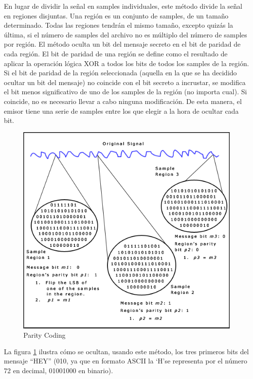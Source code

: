 \documentclass[12pt]{article}
\begin{document}
En lugar de dividir la señal en samples individuales, este método divide la señal en regiones disjuntas. Una región es un conjunto de samples, de un tamaño determinado. Todas las regiones tendrán el mismo tamaño, excepto quizás la última, si el número de samples del archivo no es múltiplo del número de samples por región. El método oculta un bit del mensaje secreto en el bit de paridad de cada región. El bit de paridad de una región se define como el resultado de aplicar la operación lógica XOR a todos los bits de todos los samples de la región. Si el bit de paridad de la región seleccionada (aquella en la que se ha decidido ocultar un bit del mensaje) no coincide con el bit secreto a incrustar, se modifica el bit menos significativo de uno de los samples de la región (no importa cual). Si coincide, no es necesario llevar a cabo ninguna modificación. De esta manera, el emisor tiene una serie de samples entre los que elegir a la hora de ocultar cada bit.

\begin{figure}
  \centering
    \includegraphics[width=\textwidth]{img/parity}
  \caption{Parity Coding}
  \label{paritycoding}
\end{figure}

La figura \ref{paritycoding} ilustra cómo se ocultan, usando este método, los tres primeros bits del mensaje ``HEY'' (010, ya que en formato ASCII la `H'\space se representa por el número 72 en decimal, 01001000 en binario).
\end{document}

